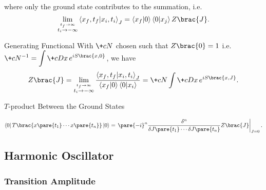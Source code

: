 \documentclass[hidelinks]{article}
\begin{document}
where only the ground state contributes to the summation, i.e.
\[ \lim_{\stackrel{t_f \rightarrow \infty}{t_i \rightarrow -\infty}}\bra{x_f,t_f}\ket{x_i,t_i}_J = \bra{x_f}\ket{0}\bra{0}\ket{x_j}Z\brac{J}. \]
\vspace{-\baselineskip}
\begin{finaleq}{Generating Functional}
    With $\+cN$ chosen such that $Z\brac{0} = 1$ i.e. $\displaystyle \+cN^{-1} = \int \+cD x\, e^{iS\brac{x,0}}$, we have
    \[ Z\brac{J} = \lim_{\stackrel{t_f \rightarrow \infty}{t_i\rightarrow -\infty}} \frac{\bra{x_f,t_f}\ket{x_i,t_i}_J}{\bra{x_f}\ket{0}\bra{0}\ket{x_i}} = \+cN \int \+cD x\, e^{iS\brac{x,J}}. \]
\end{finaleq}
\begin{finaleq}{$T$-product Between the Ground States}
    \centerline{$\displaystyle \bra{0}T\brac{x\pare{t_1}\cdots x\pare{t_n}}\ket{0} = \left.\pare{-i}^n \frac{\delta^n}{\delta J\pare{t_1}\cdots \delta J\pare{t_n}}Z\brac{J}\right\vert_{J=0}.$}
\end{finaleq}



\subsection{Harmonic Oscillator} %
\label{sub:harmonic_oscillator}

\subsubsection{Transition Amplitude} %
\label{ssub:transition_amplitude}
\end{document}
